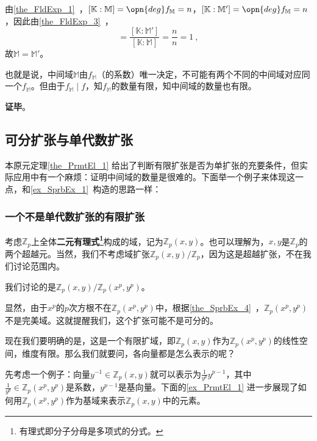 由\autoref{the_FldExp_1}~，$[\mathbb{K}:\mathbb{M}]=\opn{deg}f_\mathbb{M}=n$，$[\mathbb{K}:\mathbb{M}']=\opn{deg}f_\mathbb{M}=n$，因此由\autoref{the_FldExp_3}~，
\begin{equation}
[\mathbb{M}:\mathbb{M}']=\frac{[\mathbb{K}:\mathbb{M}']}{[\mathbb{K}:\mathbb{M}]}=\frac{n}{n}=1~,
\end{equation}
故$\mathbb{M}=\mathbb{M}'$。

也就是说，中间域$\mathbb{M}$由$f_\mathbb{M}$（的系数）唯一决定，不可能有两个不同的中间域对应同一个$f_{\mathbb{M}}$。但由于$f_\mathbb{M}\mid f$，知$f_\mathbb{M}$的数量有限，知中间域的数量也有限。

\textbf{证毕}。


\subsection{可分扩张与单代数扩张}


本原元定理\autoref{the_PrmtEl_1} 给出了判断有限扩张是否为单扩张的充要条件，但实际应用中有一个麻烦：证明中间域的数量是很难的。下面举一个例子来体现这一点，和\autoref{ex_SprbEx_1}~构造的思路一样：

\subsubsection{一个不是单代数扩张的有限扩张}

考虑$\mathbb{Z}_p$上全体\textbf{二元有理式\footnote{有理式即分子分母是多项式的分式。}}构成的域，记为$\mathbb{Z}_p(x, y)$。也可以理解为，$x, y$是$\mathbb{Z}_p$的两个超越元。当然，我们不考虑域扩张$\mathbb{Z}_p(x, y)/\mathbb{Z}_p$，因为这是超越扩张，不在我们讨论范围内。

我们讨论的是$\mathbb{Z}_p(x, y)/\mathbb{Z}_p(x^p, y^p)$。

显然，由于$x^p$的$p$次方根不在$\mathbb{Z}_p(x^p, y^p)$中，根据\autoref{the_SprbEx_4}~，$\mathbb{Z}_p(x^p, y^p)$不是完美域。这就提醒我们，这个扩张可能不是可分的。

现在我们要明确的是，这是一个有限扩域，即$\mathbb{Z}_p(x, y)$作为$\mathbb{Z}_p(x^p, y^p)$的线性空间，维度有限。那么我们就要问，各向量都是怎么表示的呢？

先考虑一个例子：向量$y^{-1}\in\mathbb{Z}_p(x, y)$就可以表示为$\frac{1}{y^p}y^{p-1}$，其中$\frac{1}{y^p}\in\mathbb{Z}_p(x^p, y^p)$是系数，$y^{p-1}$是基向量。下面的\autoref{ex_PrmtEl_1} 进一步展现了如何用$\mathbb{Z}_p(x^p, y^p)$作为基域来表示$\mathbb{Z}_p(x, y)$中的元素。

